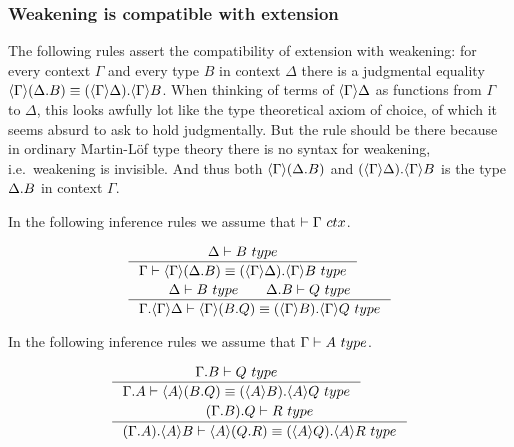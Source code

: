 \subsubsection{Weakening is compatible with extension}

The following rules assert the compatibility of extension with weakening: for
every context $\Gamma$ and every type $B$ in context $\Delta$ there is a
judgmental equality $\ctxwk{\Gamma}{\ctxext{\Delta}{B}}\jdeq\ctxext{\ctxwk{\Gamma}{\Delta}}
{\ctxwk{\Gamma}{B}}$. When thinking of terms of $\ctxwk{\Gamma}{\Delta}$ as
functions from $\Gamma$ to $\Delta$, this looks awfully lot like the type
theoretical axiom of choice, of which it seems absurd to ask to hold judgmentally.
But the rule should be there because in ordinary Martin-L\"of type theory
there is no syntax for weakening, i.e.~weakening is invisible. 
And thus both $\ctxwk{\Gamma}{\ctxext{\Delta}{B}}$ 
and $\ctxext{\ctxwk{\Gamma}{\Delta}}{\ctxwk{\Gamma}{B}}$ is the type
$\ctxext{\Delta}{B}$ in context $\Gamma$.

In the following inference rules we assume that $\jctx{\Gamma}$. 

\begin{align}
& \inference
  {\jtype{\Delta}{B}}
  {\jtypeeq{\Gamma}{\ctxwk{\Gamma}{\ctxext{\Delta}{B}}}{\ctxext{\ctxwk{\Gamma}{\Delta}}{\ctxwk{\Gamma}{B}}}}\\
& \inference
  {\jtype{\Delta}{B}\qquad\jtype{\ctxext{\Delta}{B}}{Q}}
  {\jtypeeq
    {\ctxext{\Gamma}{\ctxwk{\Gamma}{\Delta}}}
    {\ctxwk{\Gamma}{\ctxext{B}{Q}}}
    {\ctxext{\ctxwk{\Gamma}{B}}{\ctxwk{\Gamma}{Q}}}}
\end{align}

In the following inference rules we assume that $\jtype{\Gamma}{A}$.

\begin{align}
& \inference
  {\jtype{\ctxext{\Gamma}{B}}{Q}}
  {\jtypeeq{\ctxext{\Gamma}{A}}{\ctxwk{A}{\ctxext{B}{Q}}}{\ctxext{\ctxwk{A}{B}}{\ctxwk{A}{Q}}}}\\
& \inference
  {\jtype{\ctxext{{\Gamma}{B}}{Q}}{R}}
  {\jtypeeq
    {\ctxext{{\Gamma}{A}}{\ctxwk{A}{B}}}
    {\ctxwk{A}{\ctxext{Q}{R}}}
    {\ctxext{\ctxwk{A}{Q}}{\ctxwk{A}{R}}}}
\end{align}

